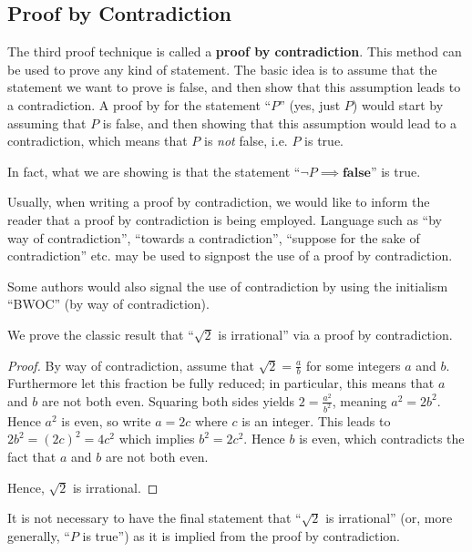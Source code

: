 \subsection{Proof by Contradiction}
The third proof technique is called a \textbf{proof by contradiction}. This method can be used to prove any kind of statement. The basic idea is to assume that the statement we want to prove is false, and then show that this assumption leads to a contradiction. A proof by for the statement ``$P$'' (yes, just $P$) would start by assuming that $P$ is false, and then showing that this assumption would lead to a contradiction, which means that $P$ is \textit{not} false, i.e. $P$ is true.
\begin{remark}
    In fact, what we are showing is that the statement ``$\lnot P \implies \textbf{false}$'' is true.
\end{remark}

Usually, when writing a proof by contradiction, we would like to inform the reader that a proof by contradiction is being employed. Language such as ``by way of contradiction'', ``towards a contradiction'', ``suppose for the sake of contradiction'' etc. may be used to signpost the use of a proof by contradiction.
\begin{remark}
    Some authors would also signal the use of contradiction by using the initialism ``BWOC'' (by way of contradiction). 
\end{remark}

\begin{example}\label{example-sqrt2-is-irrational}
    We prove the classic result that ``$\sqrt 2$ is irrational'' via a proof by contradiction.
    \begin{proof}
        By way of contradiction, assume that $\sqrt2 = \frac ab$ for some integers $a$ and $b$. Furthermore let this fraction be fully reduced; in particular, this means that $a$ and $b$ are not both even. Squaring both sides yields $2 = \frac{a^2}{b^2}$, meaning  $a^2 = 2b^2$. Hence $a^2$ is even, so write $a = 2c$ where $c$ is an integer. This leads to $2b^2 = (2c)^2 = 4c^2$ which implies $b^2 = 2c^2$. Hence $b$ is even, which contradicts the fact that $a$ and $b$ are not both even.
        
        Hence, $\sqrt 2$ is irrational.
    \end{proof}
\end{example}
\begin{remark}
    It is not necessary to have the final statement that ``$\sqrt 2$ is irrational'' (or, more generally, ``$P$ is true'') as it is implied from the proof by contradiction.
\end{remark}

